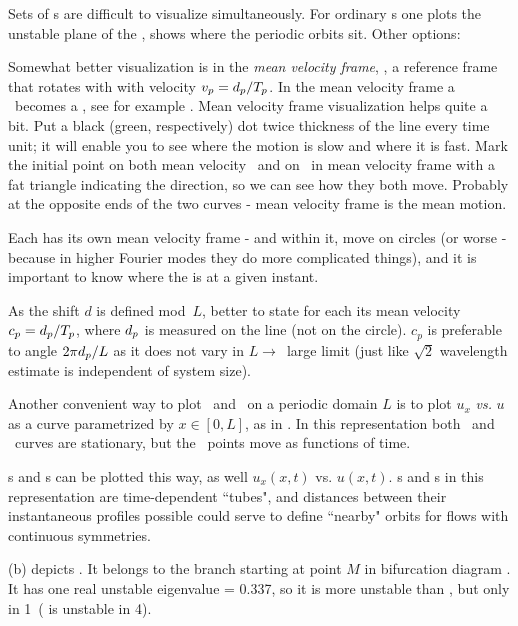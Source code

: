 Sets of \rpo s are difficult to visualize simultaneously.
For ordinary \po s one
plots the unstable plane of the \eqv, shows where the periodic
orbits sit. Other options:

Somewhat better visualization is in the
{\em mean velocity frame}, {\ie},
a reference frame that rotates with with velocity
$v_p=d_p/{T_{p}}$.
In the mean velocity frame a \rpo\ becomes
a \po, see  for example .
Mean velocity frame visualization helps quite a bit.
Put a black (green, respectively) dot
twice thickness of the line every time unit; it will enable you to see
where the motion is slow and where it is fast.
Mark the initial point on both
mean velocity \rpo\ and on \eqv\  in mean velocity
 frame with a fat triangle
indicating the direction, so we can see how they both move. Probably at the
opposite ends of the two curves - mean velocity frame is the mean motion.


Each {\rpo} has its own mean velocity frame - and within it, {\eqv}
move on circles (or worse - because in higher Fourier modes they do more
complicated things), and it is important to know where the {\eqv} is at
a given instant.

As the shift $d$ is defined mod~$L$, better to
state for each {\rpo} its mean velocity $c_p = d_p/{T_{p}}$,
where $d_p$ is measured on the line (not on the circle). $c_p$ is
preferable to angle $2\pi d_p/L$ as it does not vary in $L \to$~large
limit (just like $\sqrt{2}$ wavelength estimate is independent of
system size).

Another convenient way to plot \eqva\ and \reqva\ on a periodic
domain $L$ is to plot
$u_x$ {\em vs.} $u$ as a curve parametrized by
$x\in [0,L]$, 
as in . 
In this representation both \eqva\ and \reqva\ curves are
stationary, but the \reqva\ points move as functions of time.

\Po s and \rpo s can be plotted this way, as well
$u_x(x,t)$ vs. $u(x,t)$. \Po s and \rpo s  in this representation 
are time-dependent ``tubes", and distances between their instantaneous
profiles possible could serve to define ``nearby" orbits for
flows with continuous symmetries.

(b)
depicts .
It belongs to the branch starting at point $M$
in bifurcation diagram .
It has one real unstable eigenvalue = 0.337,
so it is more unstable than ,
but only in 1\dmn\ ( is unstable in 4\dmn).
